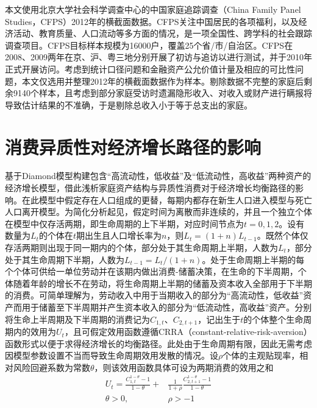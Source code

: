 \documentclass[supercite]{HustGraduPaper}
\begin{document}
    本文使用北京大学社会科学调查中心的中国家庭追踪调查（China Family Panel Studies，CFPS）2012年的横截面数据。CFPS关注中国居民的各项福利，以及经济活动、教育质量、人口流动等多方面的情况，是一项全国性、跨学科的社会跟踪调查项目。CFPS目标样本规模为16000户，覆盖25个省/市/自治区。CFPS在2008、2009两年在京、沪、粤三地分别开展了初访与追访以进行测试，并于2010年正式开展访问。考虑到统计口径问题和金融资产公允价值计量及相应的可比性问题，本文仅选用并整理2012年的横截面数据作为样本。剔除数据不完整的家庭后剩余9140个样本，且考虑到部分家庭受访时遗漏隐形收入、对收入或财产进行瞒报将导致估计结果的不准确，于是剔除总收入小于等于总支出的家庭。

    \section{消费异质性对经济增长路径的影响}
    基于Diamond模型构建包含“高流动性，低收益”及“低流动性，高收益”两种资产的经济增长模型，借此浅析家庭资产结构与异质性消费对于经济增长均衡路径的影响。在此模型中假定存在人口组成的更替，每期内都存在新生人口进入模型与死亡人口离开模型。为简化分析起见，假定时间为离散而非连续的，并且一个独立个体在模型中仅存活两期，即生命周期的上下半期，对应时间节点为$t=0,1,2$。设有数量为$L_{t}$的个体在$t$期出生且人口增长率为$n$，则$L_{t}=(1+n)L_{t-1}$。既然个体仅存活两期则出现于同一期内的个体，部分处于其生命周期上半期，人数为$L_{t}$，部分处于其生命周期下半期，人数为$L_{t-1}=L_{t}/(1+n)$。处于生命周期上半期的每个个体可供给一单位劳动并在该期内做出消费-储蓄决策，在生命的下半周期，个体随着年龄的增长不在劳动，将生命周期上半期的储蓄及资本收入全部用于下半期的消费。可简单理解为，劳动收入中用于当期收入的部分为“高流动性，低收益”资产而用于储蓄至下半周期并产生资本收入的部分为“低流动性，高收益”资产。分别将生命上半周期及下半周期的消费记为$C_{1,t}$、$C_{2,t+1}$，记出生于$t$的个体整个生命周期内的效用为$U_{t}$，且可假定效用函数遵循CRRA（constant-relative-risk-aversion）函数形式以便于求得经济增长的均衡路径。此处由于生命周期有限，因此无需考虑因模型参数设置不当而导致生命周期效用发散的情况。设$\rho$个体的主观贴现率，相对风险回避系数为常数$\theta$，则该效用函数具体可设为两期消费的效用之和
    \begin{equation}
    \begin{aligned}
    U_{t}=\frac{C_{1,t}^{1-\theta}-1}{1-\theta}+&\frac{1}{1+\rho}\frac{C_{2,t+1}^{1-\theta}-1}{1-\theta}\\
    \theta>0,\qquad & \rho>-1
    \end{aligned}
    \end{equation}
\end{document}
